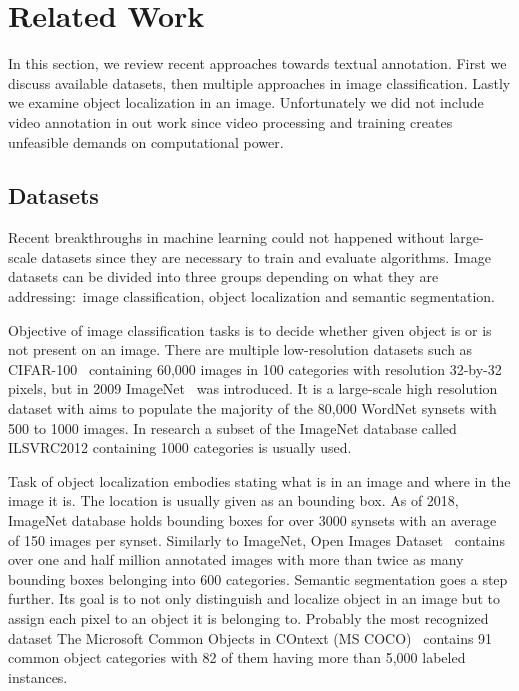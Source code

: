 \chapter{Related Work}
In this section, we review recent approaches towards textual annotation. First we discuss available datasets, then multiple approaches in image classification. Lastly we examine object localization in an image. Unfortunately we did not include video annotation in out work since video processing and training creates unfeasible demands on computational power.


\section*{Datasets}
Recent breakthroughs in machine learning could not happened without large-scale datasets since they are necessary to train and evaluate algorithms. Image datasets can be divided into three groups depending on what they are addressing:~image classification, object localization and semantic segmentation.

Objective of image classification tasks is to decide whether given object is or is not present on an image. There are multiple low-resolution datasets such as CIFAR-100~\cite{krizhevsky2009learning} containing 60,000 images in 100 categories with resolution 32-by-32 pixels, but in 2009 ImageNet~\cite{ILSVRC15} was introduced. It is a large-scale high resolution dataset with aims to populate the majority of the 80,000 WordNet synsets with 500 to 1000 images. In research a subset of the ImageNet database called ILSVRC2012 containing 1000 categories is usually used.

Task of object localization embodies stating what is in an image and where in the image it is. The location is usually given as an bounding box. As of 2018, ImageNet database holds bounding boxes for over 3000 synsets with an average of 150 images per synset. Similarly to ImageNet, Open Images Dataset~\cite{openimages} contains over one and half million annotated images with more than twice as many bounding boxes belonging into 600 categories. Semantic segmentation goes a step further. Its goal is to not only distinguish and localize object in an image but to assign each pixel to an object it is belonging to. Probably the most recognized dataset The Microsoft Common Objects in COntext (MS COCO)~\cite{lin2014microsoft} contains 91 common object categories with 82 of them having more than 5,000 labeled instances.

